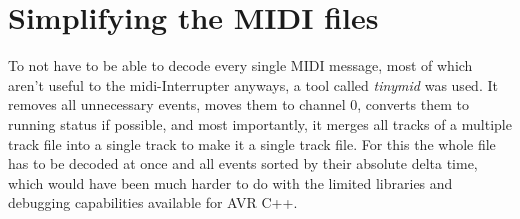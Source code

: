 \section{Simplifying the MIDI files}

To not have to be able to decode every single MIDI message, most of which aren't useful to the \gls{midi}-Interrupter anyways, a tool called \emph{tinymid} was used. It removes all unnecessary events, moves them to channel 0, converts them to running status if possible, and most importantly, it merges all tracks of a multiple track file into a single track to make it a single track file. For this the whole file has to be decoded at once and all events sorted by their absolute delta time, which would have been much harder to do with the limited libraries and debugging capabilities available for AVR C++.